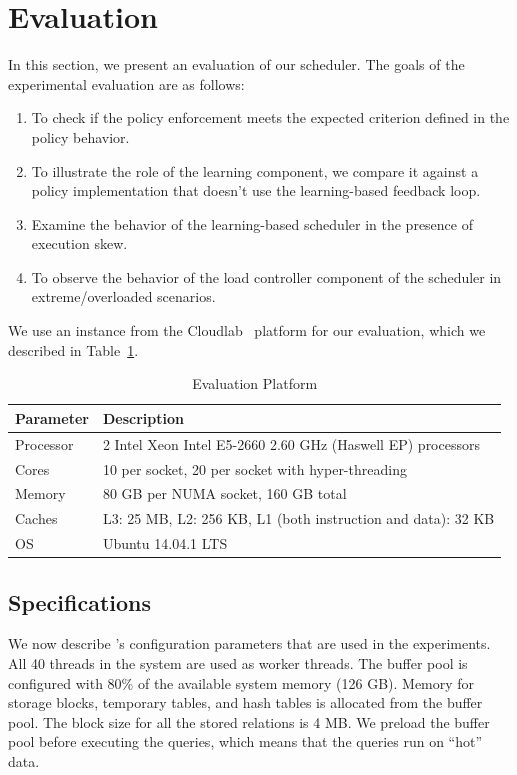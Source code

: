\section{Evaluation}\label{sec:eval}
In this section, we present an evaluation of our scheduler. 
The goals of the experimental evaluation are as follows:
\begin{enumerate}
\item To check if the policy enforcement meets the expected criterion defined in 
the policy behavior. 
\item To illustrate the role of the learning component, we compare it against a policy implementation that doesn't use the learning-based feedback loop. 
\item Examine the behavior of the learning-based scheduler in the presence of 
execution skew. 
\item To observe the behavior of the load controller component of the scheduler in extreme/overloaded scenarios.
\end{enumerate}

We use an instance from the Cloudlab~\cite{RicciEide:login14} platform for our evaluation,
which we described in Table~\ref{table:hardware}.

\begin{table}[bht]
\centering
\begin{tabular}{|p{3cm}|p{10cm}|}
\hline
\textbf{Parameter} & \textbf{Description} \\ \hline
Processor & 2 Intel Xeon Intel E5-2660 2.60 GHz (Haswell EP) processors\\ \hline
Cores & 10 per socket, 20 per socket with hyper-threading \\ \hline
Memory & 80 GB per NUMA socket, 160 GB total \\ \hline
Caches & L3: 25 MB, L2: 256 KB, L1 (both instruction and data): 32 KB \\ \hline
OS & Ubuntu 14.04.1 LTS \\ \hline
\end{tabular}
\caption{Evaluation Platform}
\label{table:hardware}
\end{table}
\subsection{\sys{} Specifications}
We now describe \sys{}'s configuration parameters that are  used in the experiments. 
All 40 threads in the system are used as worker threads.
The buffer pool is configured with 80\% of the available system memory (126 GB). 
Memory for storage blocks, temporary tables, and hash tables is allocated from the buffer 
pool.
The block size for all the stored relations is 4 MB.
We preload the buffer pool before executing the queries, which means that the queries run on ``hot'' data. 

